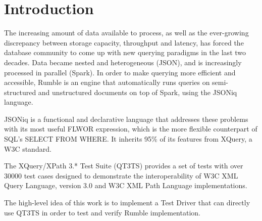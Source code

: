 
\chapter{Introduction}
\label{chapter:introduction}
The increasing amount of data available to process, as well as the ever-growing discrepancy between storage capacity, throughput and latency, has forced the database community to come up with new querying paradigms in the last two decades. Data became nested and heterogeneous (JSON), and is increasingly processed in parallel (Spark). In order to make querying more efficient and accessible, Rumble \cite{RumblePaper} is an engine that automatically runs queries on semi-structured and unstructured documents on top of Spark, using the JSONiq language. 

JSONiq \cite{JSONIQ}is a functional and declarative language that addresses these problems with its most useful FLWOR expression, which is the more flexible counterpart of SQL’s SELECT FROM WHERE. It inherits 95\% of its features from XQuery, a W3C standard.

The XQuery/XPath 3.* Test Suite (QT3TS) \cite{TestSuite} provides a set of tests with over 30000 test cases designed to demonstrate the interoperability of W3C XML Query Language, version 3.0 and W3C XML Path Language implementations.

The high-level idea of this work is to implement a Test Driver that can directly use QT3TS in order to test and verify Rumble implementation.